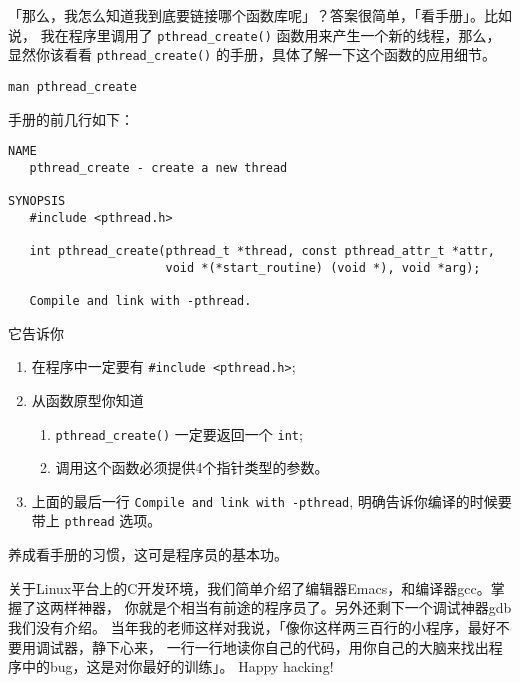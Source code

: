 \documentclass{wx672article}
\begin{document}
「那么，我怎么知道我到底要链接哪个函数库呢」？答案很简单，「看手册」。比如说，
我在程序里调用了 \texttt{pthread\_create()} 函数用来产生一个新的线程，那么，
显然你该看看 \texttt{pthread\_create()} 的手册，具体了解一下这个函数的应用细节。
\begin{verbatim}
man pthread_create
\end{verbatim}
手册的前几行如下：
\begin{verbatim}
NAME
   pthread_create - create a new thread

SYNOPSIS
   #include <pthread.h>

   int pthread_create(pthread_t *thread, const pthread_attr_t *attr,
                      void *(*start_routine) (void *), void *arg);

   Compile and link with -pthread.
\end{verbatim}
它告诉你
\begin{enumerate}
\item 在程序中一定要有 \texttt{\#include <pthread.h>};
\item 从函数原型你知道
\begin{enumerate}
\item \texttt{pthread\_create()} 一定要返回一个 \texttt{int};
\item 调用这个函数必须提供4个指针类型的参数。
\end{enumerate}
\item 上面的最后一行 \texttt{Compile and link with -pthread}, 明确告诉你编译的时候要带上
\texttt{pthread} 选项。
\end{enumerate}

养成看手册的习惯，这可是程序员的基本功。

关于Linux平台上的C开发环境，我们简单介绍了编辑器Emacs，和编译器gcc。掌握了这两样神器，
你就是个相当有前途的程序员了。另外还剩下一个调试神器gdb我们没有介绍。
当年我的老师这样对我说，「像你这样两三百行的小程序，最好不要用调试器，静下心来，
一行一行地读你自己的代码，用你自己的大脑来找出程序中的bug，这是对你最好的训练」。
Happy hacking!
\end{document}
